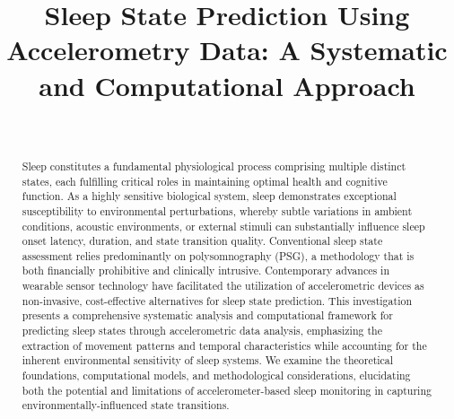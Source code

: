 \documentclass[conference]{IEEEtran}
\begin{document}
\title{Sleep State Prediction Using Accelerometry Data: A Systematic and Computational Approach}

\author{
	\\
	\and
}

\maketitle
\begin{abstract}
	Sleep constitutes a fundamental physiological process comprising multiple distinct states, each fulfilling critical roles in maintaining optimal health and cognitive function. As a highly sensitive biological system, sleep demonstrates exceptional susceptibility to environmental perturbations, whereby subtle variations in ambient conditions, acoustic environments, or external stimuli can substantially influence sleep onset latency, duration, and state transition quality. Conventional sleep state assessment relies predominantly on polysomnography (PSG), a methodology that is both financially prohibitive and clinically intrusive. Contemporary advances in wearable sensor technology have facilitated the utilization of accelerometric devices as non-invasive, cost-effective alternatives for sleep state prediction. This investigation presents a comprehensive systematic analysis and computational framework for predicting sleep states through accelerometric data analysis, emphasizing the extraction of movement patterns and temporal characteristics while accounting for the inherent environmental sensitivity of sleep systems. We examine the theoretical foundations, computational models, and methodological considerations, elucidating both the potential and limitations of accelerometer-based sleep monitoring in capturing environmentally-influenced state transitions.
\end{abstract}
\end{document}
